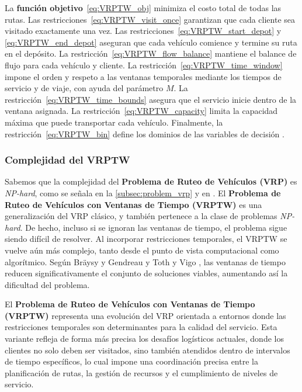 \documentclass[12pt,titlepage,twoside,openright]{book}
\begin{document}
La \textbf{función objetivo}~\eqref{eq:VRPTW_obj} minimiza el costo total de todas las rutas. Las restricciones~\eqref{eq:VRPTW_visit_once} garantizan que cada cliente sea visitado exactamente una vez. Las restricciones~\eqref{eq:VRPTW_start_depot} y \eqref{eq:VRPTW_end_depot} aseguran que cada vehículo comience y termine su ruta en el depósito. La restricción~\eqref{eq:VRPTW_flow_balance} mantiene el balance de flujo para cada vehículo y cliente. La restricción~\eqref{eq:VRPTW_time_window} impone el orden y respeto a las ventanas temporales mediante los tiempos de servicio y de viaje, con ayuda del parámetro \(M\). La restricción~\eqref{eq:VRPTW_time_bounds} asegura que el servicio inicie dentro de la ventana asignada. La restricción~\eqref{eq:VRPTW_capacity} limita la capacidad máxima que puede transportar cada vehículo. Finalmente, la restricción~\eqref{eq:VRPTW_bin} define los dominios de las variables de decisión \citep{toth2014}.

\subsubsection*{Complejidad del VRPTW}

Sabemos que la complejidad del \textbf{Problema de Ruteo de Vehículos (VRP)} es \textit{NP-hard}, como se señala en la \autoref{subsec:problem_vrp} y en \citep{laporte1987}. El \textbf{Problema de Ruteo de Vehículos con Ventanas de Tiempo (VRPTW)} es una generalización del VRP clásico, y también pertenece a la clase de problemas \textit{NP-hard}. De hecho, incluso si se ignoran las ventanas de tiempo, el problema sigue siendo difícil de resolver. Al incorporar restricciones temporales, el VRPTW se vuelve aún más complejo, tanto desde el punto de vista computacional como algorítmico. Según Bräysy y Gendreau \citep{braysy2005} y Toth y Vigo \citep{toth2014}, las ventanas de tiempo reducen significativamente el conjunto de soluciones viables, aumentando así la dificultad del problema.


El \textbf{Problema de Ruteo de Vehículos con Ventanas de Tiempo (VRPTW)} representa una evolución del VRP orientada a entornos donde las restricciones temporales son determinantes para la calidad del servicio. Esta variante refleja de forma más precisa los desafíos logísticos actuales, donde los clientes no solo deben ser visitados, sino también atendidos dentro de intervalos de tiempo específicos, lo cual impone una coordinación precisa entre la planificación de rutas, la gestión de recursos y el cumplimiento de niveles de servicio.
\end{document}
